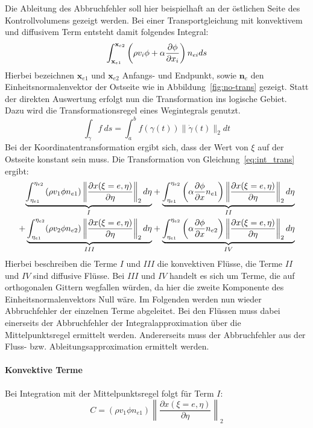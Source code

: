 Die Ableitung des Abbruchfehler soll hier beispielhaft an der östlichen Seite des Kontrollvolumens
gezeigt werden. Bei einer Transportgleichung mit konvektivem und diffusivem Term entsteht damit folgendes
Integral:
\begin{equation}
  \int_{\mathbf{x}_{e1}}^{\mathbf{x}_{e2}}\left({\rho v_i\phi+\alpha \pder[\phi]{x_i}}\right)n_{ei}ds
  \label{eq:int_trans}
\end{equation}
Hierbei bezeichnen $\mathbf{x}_{e1}$ und $\mathbf{x}_{e2}$ Anfangs- und Endpunkt, sowie $\mathbf{n}_e$
den Einheitsnormalenvektor der Ostseite wie in Abbildung~\ref{fig:no-trans} gezeigt.
Statt der direkten Auswertung erfolgt nun die Transformation ins logische Gebiet. Dazu wird die
Transformationsregel eines Wegintegrals genutzt.
\begin{equation}
  \int_{\gamma}f\ ds=\int_a^bf(\gamma (t)) \lVert \dot{\gamma}(t)\rVert_2 dt
\end{equation}
Bei der Koordinatentransformation ergibt sich, dass der Wert von $\xi$ auf der Ostseite konstant sein muss.
Die Transformation von Gleichung~\eqref{eq:int_trans} ergibt:
\begin{align*}
  \underbrace{
    \int_{\eta_{e1}}^{\eta_{e2}} \left({\rho v_1 \phi n_{e1}}\right)
  \left\lVert \frac{\partial x(\xi=e, \eta)}{\partial \eta} \right\rVert_2 d\eta
  }_I
  &+ \underbrace{
  \int_{\eta_{e1}}^{\eta_{e2}} \left({\alpha \pder[\phi]{x} n_{e1}}\right)
  \left\lVert \frac{\partial x(\xi=e, \eta)}{\partial \eta} \right\rVert_2 d\eta
}_{II}\\
  + \underbrace{
  \int_{\eta_{e1}}^{\eta_{e2}} (\rho v_2 \phi n_{e2})
  \left\lVert \frac{\partial x(\xi=e, \eta)}{\partial \eta} \right\rVert_2 d\eta
  }_{III}
  &+ \underbrace{
  \int_{\eta_{e1}}^{\eta_{e2}} \left({\alpha \pder[\phi]{x} n_{e2}}\right)
  \left\lVert \frac{\partial x(\xi=e, \eta)}{\partial \eta} \right\rVert_2 d\eta
  }_{IV}
\end{align*}
Hierbei beschreiben die Terme $I$ und $III$ die konvektiven Flüsse, die Terme $II$ und $IV$ sind
diffusive Flüsse. Bei $III$ und $IV$ handelt es sich um Terme, die auf orthogonalen Gittern wegfallen würden,
da hier die zweite Komponente des Einheitsnormalenvektors Null wäre.
Im Folgenden werden nun wieder Abbruchfehler der einzelnen Terme abgeleitet. Bei den Flüssen muss dabei
einerseits der Abbruchfehler der Integralapproximation über die Mittelpunktsregel ermittelt werden.
Andererseits muss der Abbruchfehler aus der Fluss- bzw. Ableitungsapproximation ermittelt werden.
\paragraph{Konvektive Terme}
Bei Integration mit der Mittelpunktsregel folgt für Term $I$:
\begin{equation*}
  C=(\rho v_1 \phi n_{e1})
  \left\lVert \frac{\partial x(\xi=e, \eta)}{\partial \eta} \right\rVert_2
\end{equation*}

